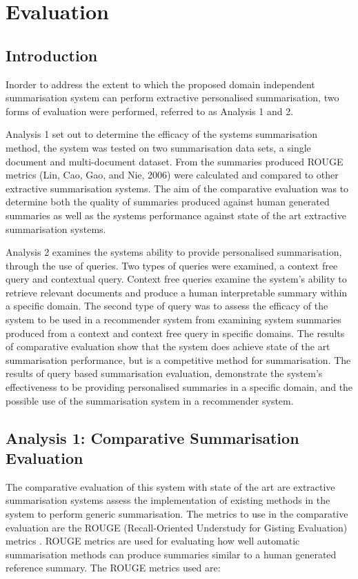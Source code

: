 \chapter{Evaluation}
\section{Introduction}
Inorder to address the extent to which the proposed domain independent summarisation system can perform extractive personalised summarisation, two forms of evaluation were performed, referred to as Analysis 1 and 2. 

Analysis 1 set out to determine the efficacy of the systems summarisation method, the system was tested on two summarisation data sets, a single document and multi-document dataset. From the summaries produced ROUGE metrics (Lin, Cao, Gao, and Nie, 2006) were calculated and compared to other extractive summarisation systems. The aim of the comparative evaluation was to determine both the quality of summaries produced against human generated summaries as well as the systems performance against state of the art extractive summarisation systems. 

Analysis 2 examines the systems ability to provide personalised summarisation, through the use of queries. Two types of queries were examined, a context free query and contextual query. Context free queries examine the system's ability to retrieve relevant documents and produce a human interpretable summary within a specific domain. The second type of query was to assess the efficacy of the system to be used in a recommender system from examining system summaries produced from a context and context free query in specific domains. The results of comparative evaluation show that the system does achieve state of the art summarisation performance, but is a competitive method for summarisation. The results of query based summarisation evaluation, demonstrate the system's effectiveness to be providing personalised summaries in a specific domain, and the possible use of the summarisation system in a recommender system.

\section{Analysis 1: Comparative Summarisation Evaluation}
The comparative evaluation of this system with state of the art are extractive summarisation systems assess the implementation of existing methods in the system to perform generic summarisation. The metrics to use in the comparative evaluation are the ROUGE (Recall-Oriented Understudy for Gisting Evaluation) metrics \citep{lin2004rouge}. ROUGE metrics are used for evaluating how well automatic summarisation methods can produce summaries similar to a human generated reference summary. The ROUGE metrics used are:

